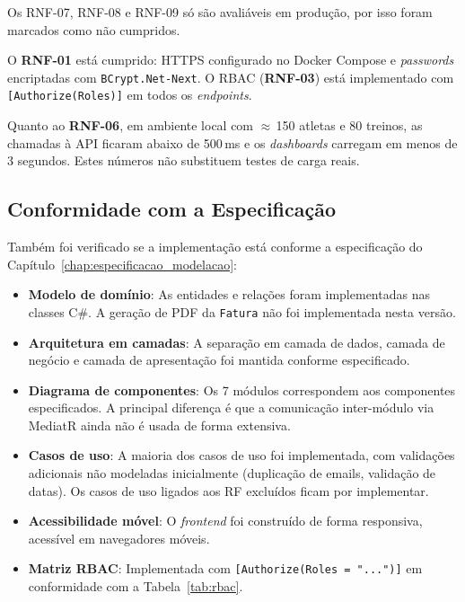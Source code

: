 
Os RNF-07, RNF-08 e RNF-09 só são avaliáveis em produção, por isso foram marcados como não cumpridos.

O \textbf{RNF-01} está cumprido: HTTPS configurado no Docker Compose e \textit{passwords} encriptadas com \texttt{BCrypt.Net-Next}. O RBAC (\textbf{RNF-03}) está implementado com \texttt{[Authorize(Roles)]} em todos os \textit{endpoints}.

Quanto ao \textbf{RNF-06}, em ambiente local com $\approx$\,150 atletas e 80 treinos, as chamadas à API ficaram abaixo de 500\,ms e os \textit{dashboards} carregam em menos de 3 segundos. Estes números não substituem testes de carga reais.

\subsection{Conformidade com a Especificação}

Também foi verificado se a implementação está conforme a especificação do Capítulo~\ref{chap:especificacao_modelacao}:

\begin{itemize}
    \item \textbf{Modelo de domínio}: As entidades e relações foram implementadas nas classes C\#. A geração de PDF da \texttt{Fatura} não foi implementada nesta versão.

    \item \textbf{Arquitetura em camadas}: A separação em camada de dados, camada de negócio e camada de apresentação foi mantida conforme especificado.

    \item \textbf{Diagrama de componentes}: Os 7 módulos correspondem aos componentes especificados. A principal diferença é que a comunicação inter-módulo via MediatR ainda não é usada de forma extensiva.

    \item \textbf{Casos de uso}: A maioria dos casos de uso foi implementada, com validações adicionais não modeladas inicialmente (duplicação de emails, validação de datas). Os casos de uso ligados aos RF excluídos ficam por implementar.

    \item \textbf{Acessibilidade móvel}: O \textit{frontend} foi construído de forma responsiva, acessível em navegadores móveis.

    \item \textbf{Matriz RBAC}: Implementada com \texttt{[Authorize(Roles = "...")]} em conformidade com a Tabela~\ref{tab:rbac}.
\end{itemize}

